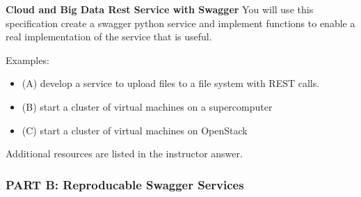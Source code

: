 \begin{exercise} {\bf Cloud and Big Data Rest Service with Swagger}
 You will use this specification create a swagger python service and
 implement functions to enable a real implementation of the service
 that is useful.

 
Examples:

\begin{itemize}
\smallskip
\item (A) develop a service to upload files to a file system with REST calls.

\item (B) start a cluster of virtual machines on a supercomputer

\item (C) start a cluster of virtual machines on OpenStack

\end{itemize}


Additional resources are listed in the instructor answer. 
\end{exercise}

\subsubsection{PART B: Reproducable Swagger Services}

